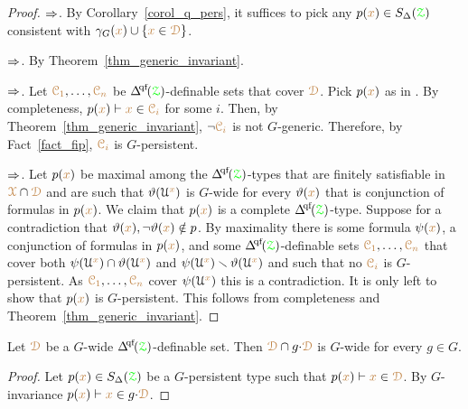 \begin{proof}
  $\Rightarrow$.
  By Corollary~\ref{corol_q_pers}, it suffices to pick any $p({\color{brown} x})\in S_\Delta({\color{green}\EuScript Z})$ consistent with $\gamma_G({\color{brown} x})\cup\{{\color{brown} x}\in{\color{brown}\EuScript D}\}$.

  $\Rightarrow$.
  By Theorem~\ref{thm_generic_invariant}.

  $\Rightarrow$.
  Let ${\color{brown}\EuScript C_1},\dots,{\color{brown}\EuScript C_n}$ be $\qfDelta({\grZ})$-definable sets that cover ${\color{brown}\EuScript D}$.
  Pick $p({\color{brown} x})$ as in .
  By completeness, $p({\color{brown} x})\vdash {\color{brown}x}\in{\color{brown}\EuScript C_i}$ for some $i$.
  Then, by Theorem~\ref{thm_generic_invariant}, $\neg{\color{brown}\EuScript C_i}$ is not $G$-generic.
  Therefore, by Fact~\ref{fact_fip}, ${\color{brown}\EuScript C_i}$ is $G$-persistent.

  $\Rightarrow$.
  Let $p({\color{brown} x})$ be maximal among the $\qfDelta({\grZ})$-types that are finitely satisfiable in ${\color{brown}\EuScript X}\cap{\color{brown}\EuScript D}$ and are such that $\vartheta(\EuScript U^{\color{brown} x})$ is $G$-wide for every $\vartheta({\color{brown} x})$ that is conjunction of formulas in $p({\color{brown} x})$.
  We claim that $p({\color{brown} x})$ is a complete $\qfDelta({\grZ})$-type.
  Suppose for a contradiction that $\vartheta({\color{brown} x}),\neg\vartheta({\color{brown} x})\notin p$.
  By maximality there is some formula $\psi({\color{brown} x})$, a conjunction of formulas in $p({\color{brown} x})$, and some $\qfDelta({\grZ})$-definable sets ${\color{brown}\EuScript C_1},\dots,{\color{brown}\EuScript C_n}$ that cover both $\psi(\EuScript U^{\color{brown} x})\cap\vartheta(\EuScript U^{\color{brown} x})$ and $\psi(\EuScript U^{\color{brown} x})\smallsetminus\vartheta(\EuScript U^{\color{brown} x})$ and such that no ${\color{brown}\EuScript C_i}$ is $G$-persistent.
  As ${\color{brown}\EuScript C_1},\dots,{\color{brown}\EuScript C_n}$ cover $\psi(\EuScript U^{\color{brown} x})$ this is a contradiction.
  It is only left to show that $p({\color{brown} x})$ is $G$-persistent.
  This follows from completeness and Theorem~\ref{thm_generic_invariant}.
\end{proof}

\begin{corollary}\label{corol_intersectionGwide}
  Let ${\color{brown}\EuScript D}$ be a $G$-wide $\qfDelta(\grZ)$-definable set.
  Then ${\color{brown}\EuScript D}\cap g{\cdot}{\color{brown}\EuScript D}$ is $G$-wide for every $g\in G$.
\end{corollary}

\begin{proof}
  Let $p({\color{brown} x})\in S_\Delta({\color{green}\EuScript Z})$ be a $G$-persistent type such that $p({\color{brown} x})\vdash{\color{brown}x}\in{\color{brown}\EuScript D}$.
  By $G$-invariance $p({\color{brown} x})\vdash{\color{brown}x}\in g{\cdot}{\color{brown}\EuScript D}$.
\end{proof}



